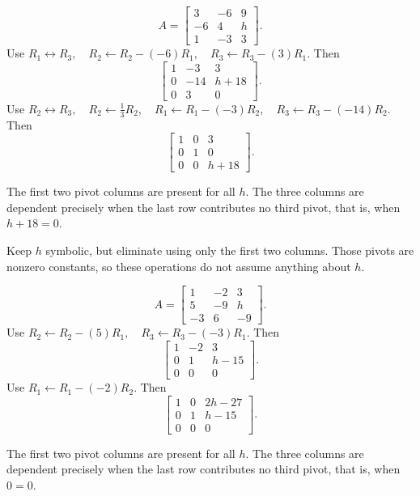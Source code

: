 \[ A=\begin{bmatrix}3 & -6 & 9\\-6 & 4 & h\\1 & -3 & 3\end{bmatrix}.\]
Use $R_{1}\leftrightarrow R_{3},\quad R_{2}\leftarrow R_{2}-(-6)R_{1},\quad R_{3}\leftarrow R_{3}-(3)R_{1}$. Then
\[ \begin{bmatrix}1 & -3 & 3\\0 & -14 & h + 18\\0 & 3 & 0\end{bmatrix}.\]
Use $R_{2}\leftrightarrow R_{3},\quad R_{2}\leftarrow \frac{1}{3}R_{2},\quad R_{1}\leftarrow R_{1}-(-3)R_{2},\quad R_{3}\leftarrow R_{3}-(-14)R_{2}$. Then
\[ \begin{bmatrix}1 & 0 & 3\\0 & 1 & 0\\0 & 0 & h + 18\end{bmatrix}.\]

The first two pivot columns are present for all $h$. The three columns are dependent precisely when the last row contributes no third pivot, that is, when $h + 18=0$.




\idea Keep $h$ symbolic, but eliminate using only the first two columns. Those pivots are nonzero constants, so these operations do not assume anything about $h$.

\[ A=\begin{bmatrix}1 & -2 & 3\\5 & -9 & h\\-3 & 6 & -9\end{bmatrix}.\]
Use $R_{2}\leftarrow R_{2}-(5)R_{1},\quad R_{3}\leftarrow R_{3}-(-3)R_{1}$. Then
\[ \begin{bmatrix}1 & -2 & 3\\0 & 1 & h - 15\\0 & 0 & 0\end{bmatrix}.\]
Use $R_{1}\leftarrow R_{1}-(-2)R_{2}$. Then
\[ \begin{bmatrix}1 & 0 & 2 h - 27\\0 & 1 & h - 15\\0 & 0 & 0\end{bmatrix}.\]

The first two pivot columns are present for all $h$. The three columns are dependent precisely when the last row contributes no third pivot, that is, when $0=0$.


